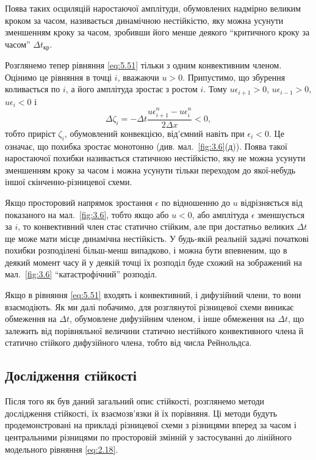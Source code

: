 Поява таких осциляцій наростаючої амплітуди, обумовлених надмірно великим кроком за часом, називається динамічною нестійкістю, яку можна усунути зменшенням кроку за часом, зробивши його менше деякого ``критичного кроку за часом'' $\Delta t_{\text{кр}}$. \medskip

Розглянемо тепер рівняння \eqref{eq:5.51} тільки з одним конвективним членом. Оцінимо це рівняння в точці $i$, вважаючи $u > 0$. Припустимо, що збурення коливається по $i$, а його амплітуда зростає з ростом $i$. Тому $u \epsilon_{i + 1} > 0$, $u \epsilon_{i - 1} > 0$, $u \epsilon_i < 0$ і 
\begin{equation}
    \label{eq:5.56}
    \Delta \zeta_i = - \Delta t \frac{u \epsilon_{i + 1}^n - u \epsilon_i^n}{2 \Delta x} < 0,
\end{equation}
тобто приріст $\zeta_i$, обумовлений конвекцією, від'ємний навіть при $\epsilon_i < 0$. Це означає, що похибка зростає монотонно (див. мал.~\ref{fig:3.6}(д)). Поява такої наростаючої похибки називається статичною нестійкістю, яку не можна усунути зменшенням кроку за часом і можна усунути тільки переходом до якої-небудь іншої скінченно-різницевої схеми. \medskip

Якщо просторовий напрямок зростання $\epsilon$ по відношенню до $u$ відрізняється від показаного на мал.~\ref{fig:3.6}, тобто якщо або $u < 0$, або амплітуда $\epsilon$ зменшується за $i$, то конвективний член стає статично стійким, але при достатньо великих $\Delta t$ ще може мати місце динамічна нестійкість. У будь-якій реальній задачі початкові похибки розподілені більш-менш випадково, і можна бути впевненим, що в деякий момент часу й у деякій точці їх розподіл буде схожий на зображений на мал.~\ref{fig:3.6} ``катастрофічний'' розподіл. \medskip

Якщо в рівняння \eqref{eq:5.51} входять і конвективний, і дифузійний члени, то вони взаємодіють. Як ми далі побачимо, для розглянутої різницевої схеми виникає обмеження на $\Delta t$, обумовлене дифузійним членом, і інше обмеження на $\Delta t$, що залежить від порівняльної величини статично нестійкого конвективного члена й статично стійкого дифузійного члена, тобто від числа Рейнольдса. 

\subsection{Дослідження стійкості}

Після того як був даний загальний опис стійкості, розглянемо методи дослідження стійкості, їх взаємозв'язки й їх порівняня. Ці методи будуть продемонстровані на прикладі різницевої схеми з різницями вперед за часом і центральними різницями по просторовій змінній у застосуванні до лінійного модельного рівняння \eqref{eq:2.18}.

